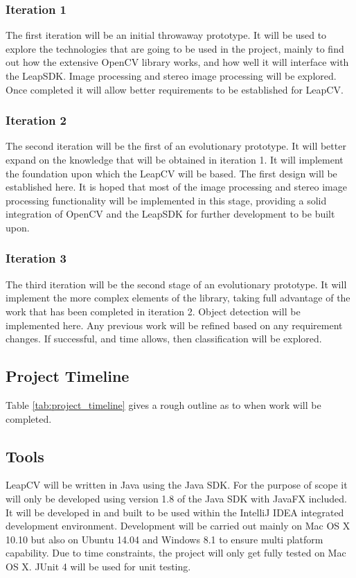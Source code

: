 \documentclass[11pt,oneside]{report}
\begin{document}
					\subsubsection{Iteration 1}
					The first iteration will be an initial throwaway prototype.
					It will be used to explore the technologies that are going to be used in the project, mainly to find out how the extensive OpenCV library works, and how well it will interface with the LeapSDK.
					Image processing and stereo image processing will be explored.
					Once completed it will allow better requirements to be established for LeapCV.
					\subsubsection{Iteration 2}
					The second iteration will be the first of an evolutionary prototype.
					It will better expand on the knowledge that will be obtained in iteration 1.
					It will implement the foundation upon which the LeapCV will be based.
					The first design will be established here.
					It is hoped that most of the image processing and stereo image processing functionality will be implemented in this stage, providing a solid integration of OpenCV and the LeapSDK for further development to be built upon.
					\subsubsection{Iteration 3}
					The third iteration will be the second stage of an evolutionary prototype.
					It will implement the more complex elements of the library, taking full advantage of the work that has been completed in iteration 2.
					Object detection will be implemented here.
					Any previous work will be refined based on any requirement changes.
					If successful, and time allows, then classification will be explored.
					\subsection{Project Timeline}
					Table \ref{tab:project_timeline} gives a rough outline as to when work will be completed.
					
			
			\subsection{Tools}
			LeapCV will be written in Java using the Java SDK.
			For the purpose of scope it will only be developed using version 1.8 of the Java SDK with JavaFX included.
			It will be developed in and built to be used within the IntelliJ IDEA integrated development environment.
			Development will be carried out mainly on Mac OS X 10.10 but also on Ubuntu 14.04 and Windows 8.1 to ensure multi platform capability.
			Due to time constraints, the project will only get fully tested on Mac OS X.
			JUnit 4 will be used for unit testing.
			
\end{document}
